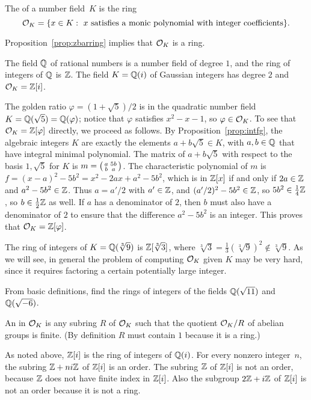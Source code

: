 \begin{definition}
The  of a number field~$K$ is the ring 
$$
  \mathcal{O}_K = \{x \in K : \text{ $x$ satisfies a monic polynomial with integer coefficients}\}.
$$
\end{definition}
Proposition~\ref{prop:zbarring} implies that $\mathcal{O}_K$ is a ring.

\begin{example}
The field $\mathbb{Q}$ of rational numbers is a number field of degree $1$,
and the ring of integers of $\mathbb{Q}$ is $\mathbb{Z}$.  The field $K=\mathbb{Q}(i)$ of
Gaussian integers has degree $2$ and $\mathcal{O}_K = \mathbb{Z}[i]$.  
\end{example}

\begin{example}\label{example:Qsqrt5ringofints}
The golden ratio $\varphi =(1+\sqrt{5})/2$ is in the quadratic number field
$K=\mathbb{Q}(\sqrt{5})=\mathbb{Q}(\varphi)$; notice that
$\varphi$ satisfies $x^2-x-1$, so $\varphi\in\mathcal{O}_K$.
To see that $\mathcal{O}_K = \mathbb{Z}[\varphi]$ directly, we proceed as follows.
By Proposition~\ref{prop:intfg}, the algebraic integers $K$
are exactly the elements $a+b\sqrt{5} \in K$, with $a,b\in\mathbb{Q}$
that have integral minimal polynomial.   The matrix of $a+b\sqrt{5}$  with respect to the 
basis $1,\sqrt{5}$ for $K$ is
$m=\left( \begin{smallmatrix}a&5b\\b&a\end{smallmatrix}\right)$.
The characteristic polynomial of $m$ is $f = (x-a)^2 - 5b^2 = x^2 - 2ax + a^2 - 5b^2$,
which is in $\mathbb{Z}[x]$ if and only if $2a\in\mathbb{Z}$ and $a^2-5b^2\in\mathbb{Z}$.
Thus $a=a'/2$ with $a'\in\mathbb{Z}$, and 
$(a'/2)^2 - 5b^2 \in\mathbb{Z}$, so $5b^2 \in \frac{1}{4}\mathbb{Z}$, so $b\in\frac{1}{2}\mathbb{Z}$ as well.
If $a$ has a denominator of $2$, then $b$ must also have a denominator of $2$ to ensure that the difference
$a^2-5b^2$ is an integer.  This proves that $\mathcal{O}_K = \mathbb{Z}[\varphi]$.  
\end{example}

\begin{example}
The
ring of integers of $K=\mathbb{Q}(\sqrt[3]{9})$ is $\mathbb{Z}[\sqrt[3]{3}]$, where
$\sqrt[3]{3}=\frac{1}{3}(\sqrt[3]{9})^2 \not \in \sqrt[3]{9}$.  As we
will see, in general the problem of computing $\mathcal{O}_K$ given $K$ may be
very hard, since it requires factoring a certain potentially large
integer.
\end{example}

\begin{exercise}
	From basic definitions, find the rings of integers of the fields
	$\mathbb{Q}(\sqrt{11})$ and $\mathbb{Q}(\sqrt{-6})$.
\end{exercise}

\begin{definition}[Order]\label{defn:order}
An  in $\mathcal{O}_K$ is any subring $R$ of $\mathcal{O}_K$ such that the
quotient $\mathcal{O}_K/R$ of abelian groups is finite.  
(By definition $R$ must contain $1$ because it is a ring.)
\end{definition}
As noted above, $\mathbb{Z}[i]$ is the ring of integers of $\mathbb{Q}(i)$.  For every
nonzero integer~$n$, the subring $\mathbb{Z}+ni\mathbb{Z}$ of $\mathbb{Z}[i]$ is an order.
The subring $\mathbb{Z}$ of $\mathbb{Z}[i]$ is not an order, because $\mathbb{Z}$ does not
have finite index in $\mathbb{Z}[i]$.  Also the subgroup $2\mathbb{Z} + i\mathbb{Z}$ of
$\mathbb{Z}[i]$ is not an order because it is not a ring.  

